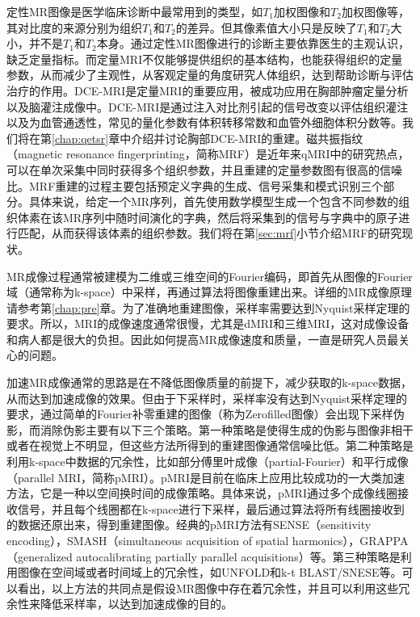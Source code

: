 定性MR图像是医学临床诊断中最常用到的类型，如$T_1$加权图像和$T_2$加权图像等，其对比度的来源分别为组织$T_1$和$T_2$的差异。但其像素值大小只是反映了$T_1$和$T_2$大小，并不是$T_1$和$T_2$本身。通过定性MR图像进行的诊断主要依靠医生的主观认识，缺乏定量指标。而定量MRI不仅能够提供组织的基本结构，也能获得组织的定量参数，从而减少了主观性，从客观定量的角度研究人体组织，达到帮助诊断与评估治疗的作用。DCE-MRI\cite{Yankeelov2009}是定量MRI的重要应用，被成功应用在胸部肿瘤定量分析以及脑灌注成像中。DCE-MRI是通过注入对比剂引起的信号改变以评估组织灌注以及为血管通透性，常见的量化参数有体积转移常数\kt 和血管外细胞体积分数\Ve 等。我们将在第\ref{chap:qetsr}章中介绍并讨论胸部DCE-MRI的重建。磁共振指纹\cite{mrf}（magnetic resonance fingerprinting，简称MRF）是近年来qMRI中的研究热点，可以在单次采集中同时获得多个组织参数，并且重建的定量参数图有很高的信噪比。MRF重建的过程主要包括预定义字典的生成、信号采集和模式识别三个部分。具体来说，给定一个MR序列，首先使用数学模型生成一个包含不同参数的组织体素在该MR序列中随时间演化的字典，然后将采集到的信号与字典中的原子进行匹配，从而获得该体素的组织参数。我们将在第\ref{sec:mrf}小节介绍MRF的研究现状。

MR成像过程通常被建模为二维或三维空间的Fourier编码，即首先从图像的Fourier域（通常称为k-space）中采样，再通过算法将图像重建出来。详细的MR成像原理请参考第\ref{chap:pre}章。为了准确地重建图像，采样率需要达到Nyquist采样定理\cite{Nyquist}的要求。所以，MRI的成像速度通常很慢，尤其是dMRI和三维MRI，这对成像设备和病人都是很大的负担。因此如何提高MR成像速度和质量，一直是研究人员最关心的问题。

加速MR成像通常的思路是在不降低图像质量的前提下，减少获取的k-space数据，从而达到加速成像的效果。但由于下采样时，采样率没有达到Nyquist采样定理的要求，通过简单的Fourier补零重建的图像（称为Zerofilled图像）会出现下采样伪影，而消除伪影主要有以下三个策略。第一种策略是使得生成的伪影与图像非相干或者在视觉上不明显\cite{Tsai,Marseille,Greiser}，但这些方法所得到的重建图像通常信噪比低。第二种策略是利用k-space中数据的冗余性，比如部分傅里叶成像\cite{McGibney}（partial-Fourier）和平行成像（parallel MRI，简称pMRI）。pMRI是目前在临床上应用比较成功的一大类加速方法，它是一种以空间换时间的成像策略。具体来说，pMRI通过多个成像线圈接收信号，并且每个线圈都在k-space进行下采样，最后通过算法将所有线圈接收到的数据还原出来，得到重建图像。经典的pMRI方法有SENSE（sensitivity encoding）\cite{sense}，SMASH（simultaneous acquisition of spatial harmonics）\cite{smash}，GRAPPA（generalized autocalibrating partially parallel acquisitions）\cite{grappa}等。第三种策略是利用图像在空间域或者时间域上的冗余性，如UNFOLD\cite{Madore}和k-t BLAST/SNESE\cite{Jeffrey2003k}等。可以看出，以上方法的共同点是假设MR图像中存在着冗余性，并且可以利用这些冗余性来降低采样率，以达到加速成像的目的。

